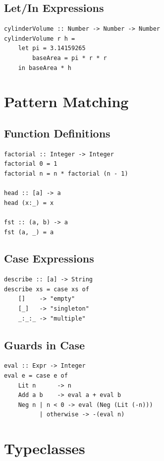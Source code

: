 \documentclass[11pt,a4paper]{article}
\begin{document}
\subsection{Let/In Expressions}

\begin{lstlisting}
cylinderVolume :: Number -> Number -> Number
cylinderVolume r h =
    let pi = 3.14159265
        baseArea = pi * r * r
    in baseArea * h
\end{lstlisting}

\section{Pattern Matching}

\subsection{Function Definitions}

\begin{lstlisting}
factorial :: Integer -> Integer
factorial 0 = 1
factorial n = n * factorial (n - 1)

head :: [a] -> a
head (x:_) = x

fst :: (a, b) -> a
fst (a, _) = a
\end{lstlisting}

\subsection{Case Expressions}

\begin{lstlisting}
describe :: [a] -> String
describe xs = case xs of
    []    -> "empty"
    [_]   -> "singleton"
    _:_:_ -> "multiple"
\end{lstlisting}

\subsection{Guards in Case}

\begin{lstlisting}
eval :: Expr -> Integer
eval e = case e of
    Lit n      -> n
    Add a b    -> eval a + eval b
    Neg n | n < 0 -> eval (Neg (Lit (-n)))
          | otherwise -> -(eval n)
\end{lstlisting}

\section{Typeclasses}
\end{document}
